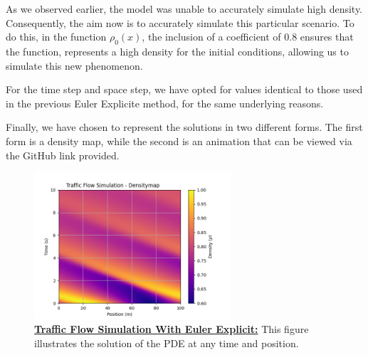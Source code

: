 \documentclass{article}
\begin{document}
	As we observed earlier, the model was unable to accurately simulate high density. Consequently, the aim now is to accurately simulate this particular scenario. To do this, in the function $\rho_0(x)$, the inclusion of a coefficient of 0.8 ensures that the function, represents a high density for the initial conditions, allowing us to simulate this new phenomenon.
	
	For the time step and space step, we have opted for values identical to those used in the previous Euler Explicite method, for the same underlying reasons.
	
	Finally, we have chosen to represent the solutions in two different forms. The first form is a density map, while the second is an animation that can be viewed via the GitHub link provided.
	
	\begin{figure}[H]
		\centering
		\includegraphics[width=0.65\textwidth]{traffic_flow_density_map_LF.png}
		\caption[Traffic Flow Simulation With Euler Explicit]{\textbf{\underline{Traffic Flow Simulation With Euler Explicit:}} This figure illustrates the solution of the PDE at any time and position.}
		\label{fig:traffic_flow_density_map_LF}
	\end{figure}
	
\end{document}
